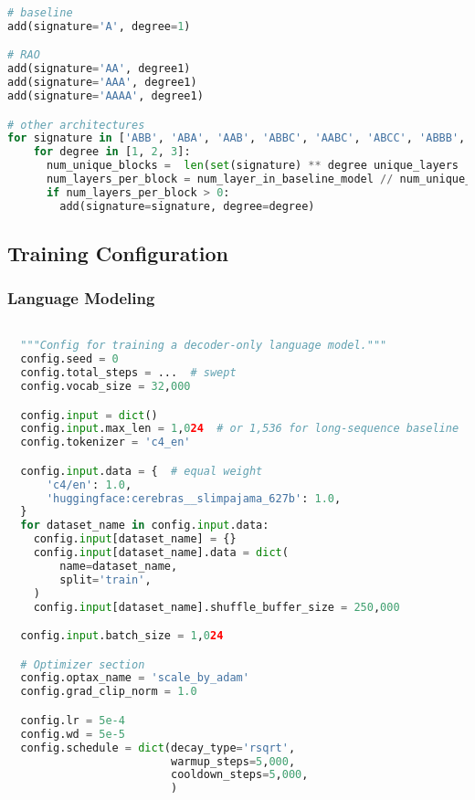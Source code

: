 \begin{lstlisting}[language=Python, style=mystyle]
# baseline
add(signature='A', degree=1)

# RAO
add(signature='AA', degree1)
add(signature='AAA', degree1)
add(signature='AAAA', degree1)

# other architectures
for signature in ['ABB', 'ABA', 'AAB', 'ABBC', 'AABC', 'ABCC', 'ABBB', 'AAAB', 'AABB']:
    for degree in [1, 2, 3]:
      num_unique_blocks =  len(set(signature) ** degree unique_layers
      num_layers_per_block = num_layer_in_baseline_model // num_unique_blocks
      if num_layers_per_block > 0:
        add(signature=signature, degree=degree)
\end{lstlisting}

\newpage
\subsection{Training Configuration}

\subsubsection{Language Modeling}

\begin{lstlisting}[language=Python, style=mystyle]

  """Config for training a decoder-only language model."""
  config.seed = 0
  config.total_steps = ...  # swept
  config.vocab_size = 32,000

  config.input = dict()
  config.input.max_len = 1,024  # or 1,536 for long-sequence baseline
  config.tokenizer = 'c4_en'

  config.input.data = {  # equal weight
      'c4/en': 1.0,
      'huggingface:cerebras__slimpajama_627b': 1.0,
  }
  for dataset_name in config.input.data:
    config.input[dataset_name] = {}
    config.input[dataset_name].data = dict(
        name=dataset_name,
        split='train',
    )
    config.input[dataset_name].shuffle_buffer_size = 250,000

  config.input.batch_size = 1,024

  # Optimizer section
  config.optax_name = 'scale_by_adam'
  config.grad_clip_norm = 1.0

  config.lr = 5e-4
  config.wd = 5e-5
  config.schedule = dict(decay_type='rsqrt',
                         warmup_steps=5,000,
                         cooldown_steps=5,000,
                         )
\end{lstlisting}

